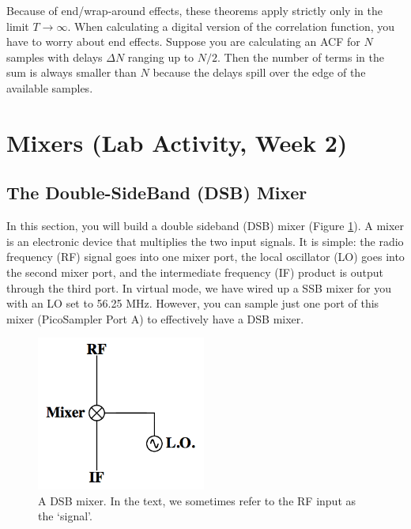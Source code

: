 \documentclass[11pt,preprint]{aastex}
\begin{document}
Because of end/wrap-around effects, these theorems apply
strictly only in the limit $T \rightarrow \infty$.
When calculating a digital version of the correlation function, you have
to worry about end effects. Suppose you are calculating an ACF for $N$
samples with delays $\Delta N$ ranging up to $N/2$. Then the number of
terms in the sum is always smaller than $N$ because the delays spill
over the edge of the available samples. 





\section{Mixers (Lab Activity, Week 2)} \label{mixersect}

\subsection{The Double-SideBand (DSB) Mixer} \label{sectdsb}

\noindent
In this section, you will build a double sideband (DSB) mixer (Figure \ref{dsb}).
A mixer is an electronic device that multiplies the two input signals. It is simple: the
radio frequency (RF) signal goes into one mixer port, the local oscillator (LO) goes into the second
mixer port, and the intermediate frequency (IF) product is output through the third port.
{\color{red} In virtual mode, we have wired up a SSB mixer for you with an LO set to 56.25 MHz. However,
you can sample just one port of this mixer (PicoSampler Port A) to effectively have a DSB mixer.}

\begin{figure}[h!]
\begin{center}
  \includegraphics[height=2in]{dsbmixer.png}
\end{center}
\caption{\footnotesize A DSB mixer. In the text, we sometimes refer to
  the RF input as the `signal'. \label{dsb}}
\end{figure}
\end{document}
